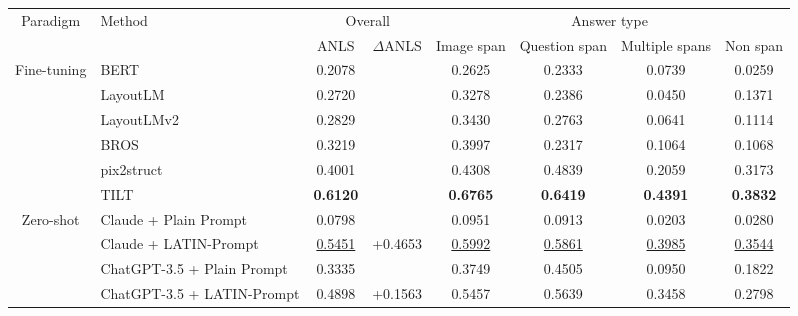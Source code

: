 \documentclass[letterpaper]{article} \usepackage{aaai24_preprint}  \usepackage{times}  \usepackage{helvet}  \usepackage{courier}  \usepackage[hyphens]{url}  \usepackage{graphicx} \urlstyle{rm} \def\UrlFont{\rm}  \usepackage{natbib}  \usepackage{caption} \frenchspacing  \setlength{\pdfpagewidth}{8.5in} \setlength{\pdfpageheight}{11in} \usepackage{algorithm}
\begin{document}
\begin{table*}[t]
\small
\centering
\begin{tabular}{@{}cl|cc|cccc@{}}
\toprule
\multirow{2}{*}{Paradigm}    & \multirow{2}{*}{Method} & \multicolumn{2}{c|}{Overall}   & \multicolumn{4}{c}{Answer type}                                       \\
                             &                         & ANLS            & $\Delta$ANLS & Image span      & Question span   & Multiple spans  & Non span        \\ \midrule
\multirow{6}{*}{Fine-tuning} & BERT                    & 0.2078          &              & 0.2625          & 0.2333          & 0.0739          & 0.0259          \\
                             & LayoutLM          & 0.2720          &              & 0.3278          & 0.2386          & 0.0450          & 0.1371          \\
                             & LayoutLMv2              & 0.2829          &              & 0.3430          & 0.2763          & 0.0641          & 0.1114          \\
                             & BROS                    & 0.3219          &              & 0.3997          & 0.2317          & 0.1064          & 0.1068          \\
                             & pix2struct              & 0.4001          &              & 0.4308          & 0.4839          & 0.2059          & 0.3173          \\
                             & TILT                    & \textbf{0.6120} &     & \textbf{0.6765} & \textbf{0.6419} & \textbf{0.4391} & \textbf{0.3832} \\ \midrule
\multirow{4}{*}{Zero-shot}   & Claude + Plain Prompt    & 0.0798          &              & 0.0951          & 0.0913          & 0.0203          & 0.0280          \\
                             & Claude + LATIN-Prompt   & \underline{0.5451}    & +0.4653      & \underline{0.5992}    & \underline{0.5861}    &\underline{0.3985}   &\underline{0.3544}    \\ \cmidrule(l){2-8} 
                             & ChatGPT-3.5 + Plain Prompt   & 0.3335          &              & 0.3749          & 0.4505          & 0.0950          & 0.1822          \\
                             & ChatGPT-3.5 + LATIN-Prompt  & 0.4898          & +0.1563      & 0.5457          & 0.5639          & 0.3458          & 0.2798          \\ \bottomrule
\end{tabular}


\end{table*}
\end{document}
